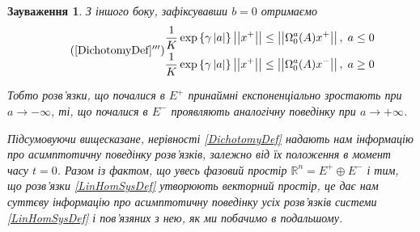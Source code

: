\documentclass[14pt]{extarticle} %
\newcommand{\mynorm}[1]{\left|\left|#1\right|\right|}
\newcommand{\myabs}[1]{\left|#1\right|}
\newtheorem{remark}{Зауваження}
\begin{document}
\begin{remark}
З іншого боку, зафіксувавши $b=0$ отримаємо
\begin{equation*}
	\tag{\ref*{DichotomyDef}$'''$}
	\begin{aligned}
	\frac{1}{K}\exp\left\{\gamma\myabs{a}\right\}\mynorm{{x}^+}\leq \mynorm{\Omega_0^a(A){x}^+},\; a\leq 0\\
	\frac{1}{K}\exp\left\{\gamma\myabs{a}\right\}\mynorm{{x}^+}\leq \mynorm{\Omega_0^a(A){x}^-},\;a\geq 0\\
\end{aligned}\end{equation*}

Тобто розв’язки, що почалися в $E^+$ принаймні 
експоненціально зростають при $a\to-\infty$, ті, що почалися в $E^-$ проявляють аналогічну поведінку при 
$a\to+\infty$. 

Підсумовуючи вищесказане, нерівності \ref{DichotomyDef} надають нам інформацію про асимптотичну поведінку розв’язків, залежно
від їх положення в момент часу $t=0$. Разом із фактом, що увесь фазовий простір $\mathbb{R}^n=E^+\oplus E^-$ і тим, що 
розв’язки \ref{LinHomSysDef} утворюють векторний простір, це дає нам суттєву інформацію про асимптотичну поведінку усіх розв’язків
системи \ref{LinHomSysDef} і пов’язяних з нею, як ми побачимо в подальшому.
\end{remark}
\end{document}
